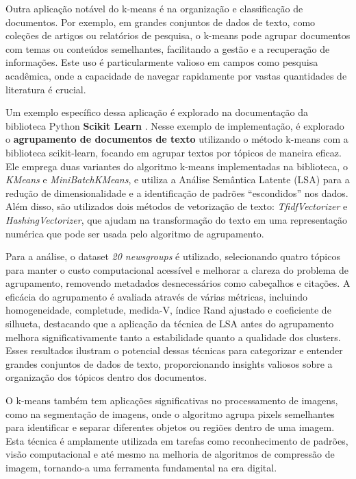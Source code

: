 \documentclass[12pt,
openright, 
oneside, %
a4paper,    %
brazil]{facom-ufu-abntex2}
\begin{document}
Outra aplicação notável do k-means é na organização e classificação de documentos. Por exemplo, em grandes conjuntos de dados de texto, como coleções de artigos ou relatórios de pesquisa, o k-means pode agrupar documentos com temas ou conteúdos semelhantes, facilitando a gestão e a recuperação de informações. Este uso é particularmente valioso em campos como pesquisa acadêmica, onde a capacidade de navegar rapidamente por vastas quantidades de literatura é crucial.

Um exemplo específico dessa aplicação é explorado na documentação da biblioteca Python \textbf{Scikit Learn} \cite{kMeansDocClustering2024}. Nesse exemplo de implementação, é explorado o \textbf{agrupamento de documentos de texto} utilizando o método k-means com a biblioteca scikit-learn, focando em agrupar textos por tópicos de maneira eficaz. Ele emprega duas variantes do algoritmo k-means implementadas na biblioteca, o \textit{KMeans} e \textit{MiniBatchKMeans}, e utiliza a Análise Semântica Latente (LSA) para a redução de dimensionalidade e a identificação de padrões \enquote{escondidos} nos dados. Além disso, são utilizados dois métodos de vetorização de texto: \textit{TfidfVectorizer} e \textit{HashingVectorizer}, que ajudam na transformação do texto em uma representação numérica que pode ser usada pelo algoritmo de agrupamento.

Para a análise, o dataset \textit{20 newsgroups} é utilizado, selecionando quatro tópicos para manter o custo computacional acessível e melhorar a clareza do problema de agrupamento, removendo metadados desnecessários como cabeçalhos e citações. A eficácia do agrupamento é avaliada através de várias métricas, incluindo homogeneidade, completude, medida-V, índice Rand ajustado e coeficiente de silhueta, destacando que a aplicação da técnica de LSA antes do agrupamento melhora significativamente tanto a estabilidade quanto a qualidade dos clusters. Esses resultados ilustram o potencial dessas técnicas para categorizar e entender grandes conjuntos de dados de texto, proporcionando insights valiosos sobre a organização dos tópicos dentro dos documentos.

O k-means também tem aplicações significativas no processamento de imagens, como na segmentação de imagens, onde o algoritmo agrupa pixels semelhantes para identificar e separar diferentes objetos ou regiões dentro de uma imagem. Esta técnica é amplamente utilizada em tarefas como reconhecimento de padrões, visão computacional e até mesmo na melhoria de algoritmos de compressão de imagem, tornando-a uma ferramenta fundamental na era digital.
\end{document}
